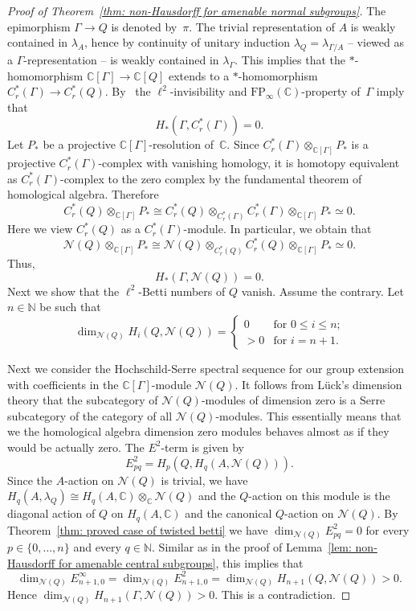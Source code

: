 \documentclass[12pt,reqno]{amsart}
\newcommand{\N}{\mathbb{N}}
\newcommand{\C}{\mathbb{C}}
\newcommand{\calN}{\mathcal{N}}
\theoremstyle{definition}
\begin{document}
\begin{proof}[Proof of Theorem~\ref{thm: non-Hausdorff for amenable normal subgroups}]
The epimorphism $\Gamma\to Q$ is denoted by~$\pi$. 
The trivial representation of $A$ is weakly contained in $\lambda_A$, hence by continuity of unitary induction $\lambda_Q=\lambda_{\Gamma/A}$ -- viewed as a $\Gamma$-representation -- is weakly contained in $\lambda_{\Gamma}$. 
This implies that the $\ast$-homomorphism $\C[\Gamma]\to \C[Q]$ extends to a $\ast$-homomorphism $C_r^\ast(\Gamma)\to C_r^\ast(Q)$. By~\cite[Lemma~12.3 on p.~442]{LuckBook} the $\ell^2$-invisibility and $\mathrm{FP}_\infty(\C)$-property of~$\Gamma$ imply that  
\[ H_\ast(\Gamma, C_r^\ast(\Gamma))=0.\]
Let $P_\ast$ be a projective $\C[\Gamma]$-resolution of~$\C$. 
Since $C_r^\ast(\Gamma)\otimes_{\C[\Gamma]}P_\ast$ is a projective $C_r^\ast(\Gamma)$-complex with vanishing homology, it is homotopy equivalent as $C_r^\ast(\Gamma)$-complex to the zero complex by the fundamental theorem of homological algebra. Therefore 
\[ C_r^\ast(Q)\otimes_{\C[\Gamma]} P_\ast\cong C_r^\ast(Q)\otimes_{C_r^\ast(\Gamma)} C_r^\ast(\Gamma)\otimes_{\C[\Gamma]}P_\ast\simeq 0.\]
Here we view $C_r^\ast(Q)$ as a $C_r^\ast(\Gamma)$-module. In particular, we obtain that 
\[ \calN(Q)\otimes_{\C[\Gamma]} P_\ast\cong \calN(Q)\otimes_{C_r^\ast(Q)}C_r^\ast(Q)\otimes_{\C[\Gamma]}P_\ast\simeq 0.\]
Thus, 
\begin{equation*} H_\ast(\Gamma, \calN(Q))=0. 
\end{equation*}	
Next we show that the $\ell^2$-Betti numbers of $Q$ vanish. Assume the contrary. Let $n\in\N$ be such that 
\[
\dim_{\calN(Q)}H_i(Q,\calN(Q))=
\begin{cases}
0 &\text{for $0\le i\le n$;}\\
>0 & \text{for $i=n+1$.}
\end{cases}\]

Next we consider the Hochschild-Serre spectral sequence for our group extension with coefficients in the $\C[\Gamma]$-module $\calN(Q)$. It follows from L\"uck's dimension theory that the subcategory of $\calN(Q)$-modules of dimension zero is a Serre subcategory of the category of all $\calN(Q)$-modules. This essentially means that we the homological algebra  dimension zero modules behaves almost as if they would be actually zero. 
The $E^2$-term is given by 
\[
E^2_{pq}=H_p(Q, H_q(A, \calN(Q))).
\]	
Since the $A$-action on $\calN(Q)$ is trivial, we have 
$H_q(A, \lambda_Q)\cong H_q(A,\C)\otimes_\C \calN(Q)$ and the $Q$-action on this module is the diagonal action of $Q$ on $H_q(A,\C)$ and the canonical $Q$-action on $\calN(Q)$. By Theorem~\ref{thm: proved case of twisted betti} we have $\dim_{\calN(Q)}E^2_{pq}=0$ for every $p\in \{0,\dots, n\}$ and every $q\in\N$. Similar as in the proof of Lemma~\ref{lem: non-Hausdorff for amenable central subgroups}, this implies that \[\dim_{\calN(Q)}E^\infty_{n+1,0}=\dim_{\calN(Q)}E^2_{n+1,0}=\dim_{\calN(Q)}H_{n+1}(Q,\calN(Q))>0.\] 
Hence $\dim_{\calN(Q)}H_{n+1}(\Gamma, \calN(Q))>0$. This is a contradiction. 
\end{proof}
\end{document}
